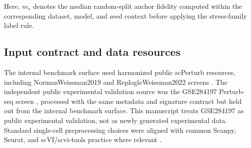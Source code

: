 \begin{center}
\end{center}

Here, \(m_s\) denotes the median random-split anchor fidelity computed within the corresponding dataset, model, and seed context before applying the stress-family label rule.

\subsection{Input contract and data resources}

The internal benchmark surface used harmonized public scPerturb resources, including NormanWeissman2019 and ReplogleWeissman2022 screens \citep{norman2019manifolds,replogle2022genome,peidli2024scperturb}. The independent public experimental validation source was the GSE284197 Perturb-seq screen \citep{geo2025gse284197}, processed with the same metadata and signature contract but held out from the internal benchmark surface. This manuscript treats GSE284197 as public experimental validation, not as newly generated experimental data. Standard single-cell preprocessing choices were aligned with common Scanpy, Seurat, and scVI/scvi-tools practice where relevant \citep{wolf2018scanpy,stuart2019integration,hafemeister2019sctransform,lopez2018scvi,gayoso2022scvitools}.

